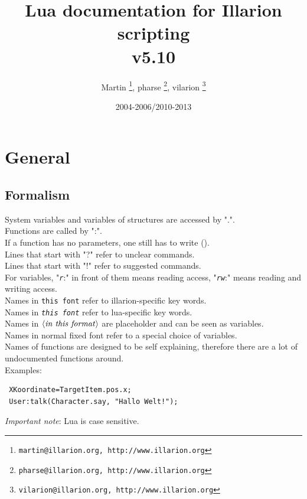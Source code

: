 \documentclass[a4paper,10pt,makeidx]{scrreprt}
\newcommand{\comm}[1]{\index{#1}\texttt{#1}}
\newcommand{\var}[1]{$\left\langle \text{\emph{#1}} \right\rangle$}
\newcommand{\lua}[1]{\index{#1}\texttt{\emph{#1}}}
\begin{document}
\lstset{basicstyle=\small, keywordstyle=\ttfamily, identifierstyle=\ttfamily}
\title{Lua documentation for Illarion scripting\\v5.10}
\author{Martin \thanks{ \texttt{martin@illarion.org, http://www.illarion.org}},
pharse \thanks{ \texttt{pharse@illarion.org, http://www.illarion.org}},
vilarion \thanks{ \texttt{vilarion@illarion.org, http://www.illarion.org}}}
\date{2004-2006/2010-2013}
\maketitle
\tableofcontents
\chapter{General}
\section{Formalism}
System variables and variables of structures are accessed by ".".\\
Functions are called by ":".\\
If a function has no parameters, one still has to write ().\\
Lines that start with "?" refer to unclear commands.\\
Lines that start with "!" refer to suggested commands.\\
For variables, "\lua{r}:" in front of them means reading access, "\lua{rw}:" means reading and writing access.\\
Names in \comm{this font} refer to illarion-specific key words.\\
Names in \lua{this font} refer to lua-specific key words.\\
Names in \var{in this format} are placeholder and can be seen as variables.\\
Names in normal fixed font refer to a special choice of variables.\\
Names of functions are designed to be self explaining, therefore there are a lot of undocumented functions around.\\

Examples:\\
\begin{verbatim}
 XKoordinate=TargetItem.pos.x;
 User:talk(Character.say, "Hallo Welt!");
\end{verbatim}
\emph{Important note}: Lua is case sensitive.
\end{document}

